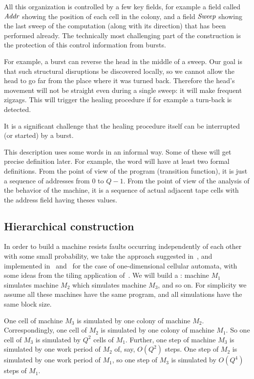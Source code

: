 \documentclass[11pt]{memoir}
\theoremstyle{definition} %
\newcommand{\fld}[1]{\ensuremath{\textit{#1\/}}}
\newcommand{\Q}{Q}
\newcommand{\Addr}{\fld{Addr}}
\newcommand{\Sweep}{\fld{Sweep}}
\begin{document}
All this organization is controlled by a few key fields, for example a field
called \( \Addr \) showing the position of each cell in the colony, and a field
\( \Sweep \) showing the last sweep of the computation (along with its direction)
that has been performed already.
The technically most challenging part of the construction is the protection of this
control information from bursts.

For example, a burst can reverse the head in the middle of a sweep.
Our goal is that such structural disruptions be discovered locally, so
we cannot allow the head to go far from the place where it was turned back.
Therefore the head's movement will not be straight even during a single
sweep: it will make frequent zigzags.
This will trigger the healing procedure if for example a turn-back is detected.

It is a significant challenge that the healing procedure
itself can be interrupted (or started) by a burst.

\begin{remark}
This description uses some words in an informal way.
Some of these will get precise definition later.
For example, the word  will have at least two formal definitions.
From the point of view of the program (transition function), it is just a 
sequence of addresses from \( 0 \) to \( \Q-1 \).
From the point of view of the analysis of the behavior of the machine, it is a sequence of
actual adjacent tape cells with the address field having theses values.
\end{remark}


\subsection{Hierarchical construction}\label{sec:hier}

In order to build a machine resists faults 
occurring independently of each other with some small probability,
we take the approach suggested in~\cite{Kurd78},
and implemented in~\cite{Gacs1dim86} and~\cite{GacsSorg01}
for the case of one-dimensional cellular automata, with some ideas
from the tiling application of~\cite{DurandRomashShenTiling12}.
We will build a :
machine \( M_{1} \) simulates machine \( M_{2} \) which 
simulates machine \( M_3 \), and so on.
For simplicity we assume all these machines have the same program,
and all simulations have the same block size.

One cell of machine \( M_3 \) is simulated by one colony of machine \( M_{2} \).
Correspondingly, one cell of \( M_{2} \) is simulated by
one colony of machine \( M_{1} \).
So one cell of \( M_3 \) is simulated by \( \Q^{2} \) cells of \( M_{1} \).
Further, one step of machine \( M_3 \) is simulated by one
work period of \( M_{2} \) of, say, \( O(\Q^{2}) \) steps.
One step of \( M_{2} \) is simulated by one work period of \( M_{1} \),
so one step of \( M_3 \) is simulated by \( O(\Q^{4}) \) steps of \( M_{1} \).
\end{document}
